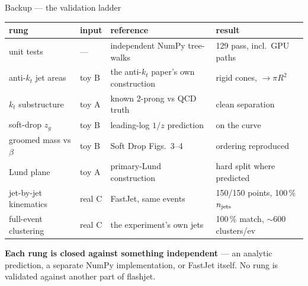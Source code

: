 \documentclass[aspectratio=169,10pt]{beamer}
\newcommand{\akt}{anti-$k_t$}
\newcommand{\toyAtxt}{\textcolor{fjblue}{toy A}}
\newcommand{\toyBtxt}{\textcolor{fjblue}{toy B}}
\newcommand{\realCtxt}{\textcolor{fjgreen}{real C}}
\begin{document}
\begin{frame}{Backup --- the validation ladder}
\begin{center}
\small
\begin{tabular}{@{}llll@{}}
\toprule
\textbf{rung} & \textbf{input} & \textbf{reference} & \textbf{result}\\
\midrule
unit tests & --- & independent NumPy tree-walks & 129 pass, incl.\ GPU paths\\
\addlinespace
\akt{} jet areas & \toyBtxt & the \akt{} paper's own construction & rigid cones,
$\to\pi R^2$\\
$k_t$ substructure & \toyAtxt & known 2-prong vs QCD truth & clean separation\\
soft-drop $z_g$ & \toyBtxt & leading-log $1/z$ prediction & on the curve\\
groomed mass vs $\beta$ & \toyBtxt & Soft Drop Figs.~3--4 & ordering reproduced\\
Lund plane & \toyAtxt & primary-Lund construction & hard split where predicted\\
\addlinespace
jet-by-jet kinematics & \realCtxt & FastJet, same events & 150/150 points,
100\,\% $n_{\rm jets}$\\
full-event clustering & \realCtxt & the experiment's own jets & 100\,\% match,
$\sim$600 clusters/ev\\
\bottomrule
\end{tabular}
\end{center}
\medskip

\begin{block}{}
\small \textbf{Each rung is closed against something independent} --- an
analytic prediction, a separate NumPy implementation, or FastJet itself. No rung
is validated against another part of flashjet.
\end{block}
\end{frame}
\end{document}
